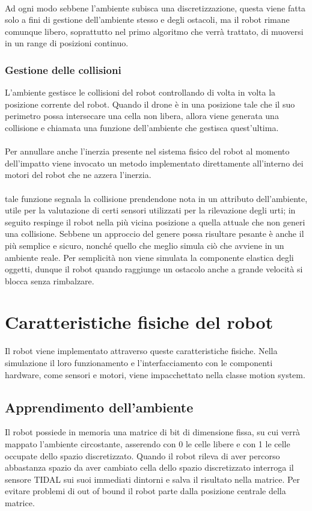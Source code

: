 \documentclass{article}
\begin{document}
\paragraph{}
Ad ogni modo sebbene l'ambiente subisca una discretizzazione, questa viene fatta solo a fini di gestione dell'ambiente stesso e degli ostacoli, ma il robot rimane comunque libero, soprattutto nel primo algoritmo che verrà trattato, di muoversi in un range di posizioni continuo.
\subsubsection{Gestione delle collisioni}
L'ambiente gestisce le collisioni del robot controllando di volta in volta la posizione corrente del robot. Quando il drone è in una posizione tale che il suo perimetro possa intersecare una cella non libera, allora viene generata una collisione e chiamata una funzione dell'ambiente che gestisca quest'ultima.
\paragraph{}
Per annullare anche l'inerzia presente nel sistema fisico del robot al momento dell'impatto viene invocato un metodo implementato direttamente all'interno dei motori del robot che ne azzera l'inerzia.
\paragraph{}
tale funzione segnala la collisione prendendone nota in un attributo dell'ambiente, utile per la valutazione di certi sensori utilizzati per la rilevazione degli urti; in seguito respinge il robot nella più vicina posizione a quella attuale che non generi una collisione. Sebbene un approccio del genere possa risultare pesante è anche il più semplice e sicuro, nonché quello che meglio simula ciò che avviene in un ambiente reale. Per semplicità non viene simulata la componente elastica degli oggetti, dunque il robot quando raggiunge un ostacolo anche a grande velocità si blocca senza rimbalzare.
\section{Caratteristiche fisiche del robot}
Il robot viene implementato attraverso queste caratteristiche fisiche.
Nella simulazione il loro funzionamento e l'interfacciamento con le componenti hardware, come sensori e motori, viene impacchettato nella classe motion system.
\subsection{Apprendimento dell'ambiente}
Il robot possiede  in memoria una matrice di bit di dimensione fissa, su cui verrà mappato l'ambiente circostante, asserendo con 0 le celle libere e con 1 le celle occupate dello spazio discretizzato. Quando il robot rileva di aver percorso abbastanza spazio da aver cambiato cella dello spazio discretizzato interroga il sensore TIDAL sui suoi immediati dintorni e salva il risultato nella matrice. Per evitare problemi di out of bound il robot parte dalla posizione centrale della matrice.
\end{document}
